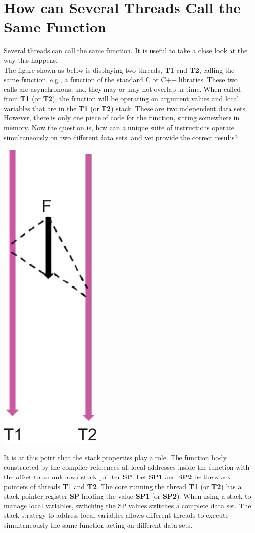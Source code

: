 \documentclass[12pt,a4paper]{article}
\begin{document}
\section{How can Several Threads Call the Same Function}
Several threads can call the same function. It is useful to take a close look at the way this happens.
\\
The figure shown as below is displaying two threads, \textbf{T1} and \textbf{T2}, calling the same function, e.g., a function of the standard C or C++ libraries. These two calls are asynchronous, and they may or may not overlap in time. When called from \textbf{T1} (or \textbf{T2}), the function will be operating on argument values and local variables that are in the \textbf{T1} (or \textbf{T2}) stack. These are two independent data sets. However, there is only one piece of code for the function, sitting somewhere in memory. Now the question is, how can a unique suite of instructions operate simultaneously on two different data sets, and yet provide the correct results?
\begin{center}
	\includegraphics{sm_two_threads_same_function.jpg}
\end{center}
It is at this point that the stack properties play a role. The function body constructed by the compiler references all local addresses inside the function with the offset to an unknown stack pointer \textbf{SP}. Let \textbf{SP1} and \textbf{SP2} be the stack pointers of threads \textbf{T}1 and \textbf{T2}. The core running the thread \textbf{T1} (or \textbf{T2}) has a stack pointer register \textbf{SP} holding the value \textbf{SP1} (or \textbf{SP2}). When using a stack to manage local variables, switching the SP values switches a complete data set. The stack strategy to address local variables allows different threads to execute simultaneously the same function acting on different data sets.
\end{document}

